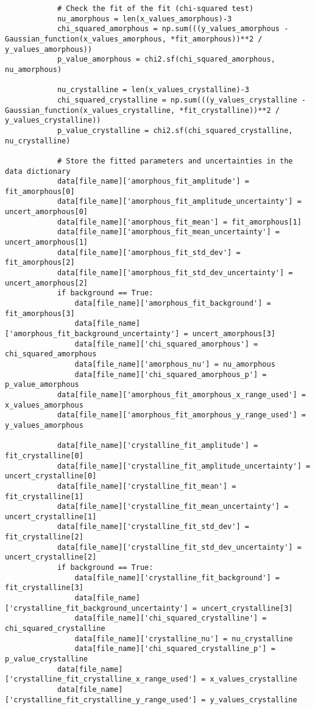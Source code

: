 \begin{small}
\begin{verbatim}
            # Check the fit of the fit (chi-squared test)
            nu_amorphous = len(x_values_amorphous)-3
            chi_squared_amorphous = np.sum(((y_values_amorphous - Gaussian_function(x_values_amorphous, *fit_amorphous))**2 / y_values_amorphous))
            p_value_amorphous = chi2.sf(chi_squared_amorphous, nu_amorphous)

            nu_crystalline = len(x_values_crystalline)-3
            chi_squared_crystalline = np.sum(((y_values_crystalline - Gaussian_function(x_values_crystalline, *fit_crystalline))**2 / y_values_crystalline))
            p_value_crystalline = chi2.sf(chi_squared_crystalline, nu_crystalline)

            # Store the fitted parameters and uncertainties in the data dictionary
            data[file_name]['amorphous_fit_amplitude'] = fit_amorphous[0]
            data[file_name]['amorphous_fit_amplitude_uncertainty'] = uncert_amorphous[0]
            data[file_name]['amorphous_fit_mean'] = fit_amorphous[1]
            data[file_name]['amorphous_fit_mean_uncertainty'] = uncert_amorphous[1]
            data[file_name]['amorphous_fit_std_dev'] = fit_amorphous[2]
            data[file_name]['amorphous_fit_std_dev_uncertainty'] = uncert_amorphous[2]
            if background == True:
                data[file_name]['amorphous_fit_background'] = fit_amorphous[3]
                data[file_name]['amorphous_fit_background_uncertainty'] = uncert_amorphous[3]
                data[file_name]['chi_squared_amorphous'] = chi_squared_amorphous
                data[file_name]['amorphous_nu'] = nu_amorphous
                data[file_name]['chi_squared_amorphous_p'] = p_value_amorphous
            data[file_name]['amorphous_fit_amorphous_x_range_used'] = x_values_amorphous
            data[file_name]['amorphous_fit_amorphous_y_range_used'] = y_values_amorphous

            data[file_name]['crystalline_fit_amplitude'] = fit_crystalline[0]
            data[file_name]['crystalline_fit_amplitude_uncertainty'] = uncert_crystalline[0]
            data[file_name]['crystalline_fit_mean'] = fit_crystalline[1]
            data[file_name]['crystalline_fit_mean_uncertainty'] = uncert_crystalline[1]
            data[file_name]['crystalline_fit_std_dev'] = fit_crystalline[2]
            data[file_name]['crystalline_fit_std_dev_uncertainty'] = uncert_crystalline[2]
            if background == True:
                data[file_name]['crystalline_fit_background'] = fit_crystalline[3]
                data[file_name]['crystalline_fit_background_uncertainty'] = uncert_crystalline[3]
                data[file_name]['chi_squared_crystalline'] = chi_squared_crystalline
                data[file_name]['crystalline_nu'] = nu_crystalline
                data[file_name]['chi_squared_crystalline_p'] = p_value_crystalline
            data[file_name]['crystalline_fit_crystalline_x_range_used'] = x_values_crystalline
            data[file_name]['crystalline_fit_crystalline_y_range_used'] = y_values_crystalline


\end{verbatim}
\end{small}
